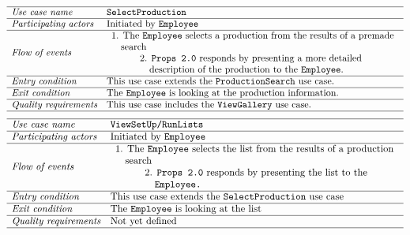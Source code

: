 \documentclass[12pt]{article}
\begin{document}
\[
\begin{array}{ll}
\hline
\textit{Use case name} & \texttt{SelectProduction} \\
\hline
\textit{Participating actors} & \text{Initiated by \texttt{Employee}} \\
\hline
\textit{Flow of events} & 
\begin{array}{l}
\text{1. The \texttt{Employee} selects a production from the results of a premade}\\ \quad \text{search}\\
\quad \quad \quad \text{2. \texttt{Props 2.0} responds by presenting a more detailed}\\
\quad \quad \quad \quad \text{description of the production to the \texttt{Employee}.}
\end{array} \\
\hline
\textit{Entry condition} &
\text{This use case extends the \texttt{ProductionSearch} use case.}\\
\hline
\textit{Exit condition} & \text{The \texttt{Employee} is looking at the production information.} \\
\hline
\textit{Quality requirements} & \text{This use case includes the \texttt{ViewGallery} use case.} \\
\hline
\end{array}
\]
\[
\begin{array}{ll}
\hline
\textit{Use case name} & \texttt{ViewSetUp/RunLists} \\
\hline
\textit{Participating actors} & \text{Initiated by \texttt{Employee}} \\
\hline
\textit{Flow of events} & 
\begin{array}{l}
\text{1. The \texttt{Employee} selects the list from the results of a production} \\ \quad \text{search} \\
\quad \quad \quad \text{2. \texttt{Props 2.0} responds by presenting the list to the}\\ \quad \quad \quad \quad \texttt{Employee.}
\end{array} \\
\hline
\textit{Entry condition} & \text{This use case extends the  \texttt{SelectProduction} use case} \\
\hline
\textit{Exit condition} & \text{The \texttt{Employee} is looking at the list} \\
\hline
\textit{Quality requirements} & \text{Not yet defined} \\
\hline
\end{array}
\]
\end{document}
